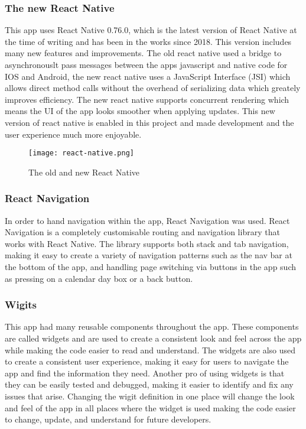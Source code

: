 \subsubsection{The new React Native}
This app uses React Native 0.76.0, which is the latest version of React Native at the time of writing and has been in the works since 2018. This version includes many new features and improvements. The old react native used a bridge to asynchronouslt pass messages between the apps javascript and native code for IOS and Android, the new react native uses a JavaScript Interface (JSI) which allows direct method calls without the overhead of serializing data which greately improves efficiency\cite{ReactNative2024}. The new react native supports concurrent rendering which means the UI of the app looks smoother when applying updates. This new version of react native is enabled in this project and made development and the user experience much more enjoyable.

\begin{figure}[h!!]
    \begin{center}
      \texttt{[image: react-native.png]}
      \caption{The old and new React Native\cite{ReactNative2024}}
      \label{figure:react-native}
    \end{center}
  \end{figure}

\subsubsection{React Navigation}
In order to hand navigation within the app, React Navigation was used. React Navigation is a completely customisable routing and navigation library that works with React Native. The library supports both stack and tab navigation, making it easy to create a variety of navigation patterns such as the nav bar at the bottom of the app, and handling page switching via buttons in the app such as pressing on a calendar day box or a back button. 

\subsubsection{Wigits}
This app had many reusable components throughout the app. These components are called widgets and are used to create a consistent look and feel across the app while making the code easier to read and understand. The widgets are also used to create a consistent user experience, making it easy for users to navigate the app and find the information they need. Another pro of using widgets is that they can be easily tested and debugged, making it easier to identify and fix any issues that arise. Changing the wigit definition in one place will change the look and feel of the app in all places where the widget is used making the code easier to change, update, and understand for future developers. 

